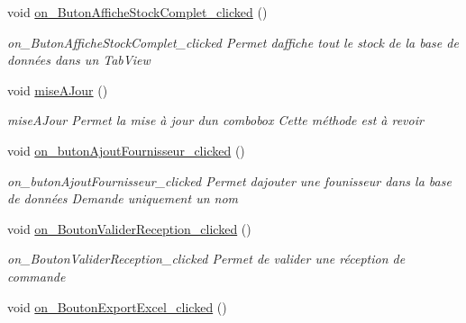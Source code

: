 \begin{DoxyCompactItemize}
\mbox{\label{class_main_window_a47f273a07e54a4c9976185416b27d8ce}} 
void \mbox{\hyperlink{class_main_window_a47f273a07e54a4c9976185416b27d8ce}{on\+\_\+\+Buton\+Affiche\+Stock\+Complet\+\_\+clicked}} ()
\begin{DoxyCompactList}\small\item\em on\+\_\+\+Buton\+Affiche\+Stock\+Complet\+\_\+clicked Permet d\textquotesingle{}affiche tout le stock de la base de données dans un Tab\+View \end{DoxyCompactList}\item 
\mbox{\label{class_main_window_a679b79f7dc85053cd72b3b8994715608}} 
void \mbox{\hyperlink{class_main_window_a679b79f7dc85053cd72b3b8994715608}{mise\+A\+Jour}} ()
\begin{DoxyCompactList}\small\item\em mise\+A\+Jour Permet la mise à jour d\textquotesingle{}un combobox Cette méthode est à revoir \end{DoxyCompactList}\item 
\mbox{\label{class_main_window_ab1d5712c5fbe89bf56f3f8ae4f494032}} 
void \mbox{\hyperlink{class_main_window_ab1d5712c5fbe89bf56f3f8ae4f494032}{on\+\_\+buton\+Ajout\+Fournisseur\+\_\+clicked}} ()
\begin{DoxyCompactList}\small\item\em on\+\_\+buton\+Ajout\+Fournisseur\+\_\+clicked Permet d\textquotesingle{}ajouter une founisseur dans la base de données Demande uniquement un nom \end{DoxyCompactList}\item 
\mbox{\label{class_main_window_aa8a2a01015fc61d0a72d372524801443}} 
void \mbox{\hyperlink{class_main_window_aa8a2a01015fc61d0a72d372524801443}{on\+\_\+\+Bouton\+Valider\+Reception\+\_\+clicked}} ()
\begin{DoxyCompactList}\small\item\em on\+\_\+\+Bouton\+Valider\+Reception\+\_\+clicked Permet de valider une réception de commande \end{DoxyCompactList}\item 
\mbox{\label{class_main_window_a6c79527bd4d4c168e78b980fff0ab088}} 
void \mbox{\hyperlink{class_main_window_a6c79527bd4d4c168e78b980fff0ab088}{on\+\_\+\+Bouton\+Export\+Excel\+\_\+clicked}} ()

\end{DoxyCompactItemize}
